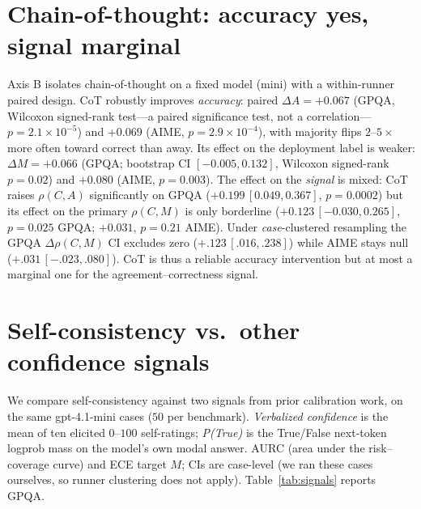 \documentclass[11pt]{article}
\newcommand{\C}{\textit{C}}
\newcommand{\A}{\textit{A}}
\newcommand{\Mlab}{\textit{M}}
\begin{document}
\section{Chain-of-thought: accuracy yes, signal marginal}
\label{sec:cot}
Axis B isolates chain-of-thought on a fixed model (mini) with a within-runner paired design. CoT
robustly improves \emph{accuracy}: paired $\Delta\A=+0.067$ (GPQA, Wilcoxon signed-rank test---a paired significance test, not a correlation---$p{=}2.1{\times}10^{-5}$)
and $+0.069$ (AIME, $p{=}2.9{\times}10^{-4}$), with majority flips $2$--$5{\times}$ more often toward
correct than away. Its effect on the deployment label is weaker: $\Delta\Mlab=+0.066$ (GPQA; bootstrap
CI $[-0.005,0.132]$, Wilcoxon signed-rank $p{=}0.02$) and $+0.080$ (AIME, $p{=}0.003$). The effect on the
\emph{signal} is mixed: CoT raises $\rho(\C,\A)$ significantly on GPQA ($+0.199\,[0.049,0.367]$,
$p{=}0.0002$) but its effect on the primary $\rho(\C,\Mlab)$ is only borderline
($+0.123\,[-0.030,0.265]$, $p{=}0.025$ GPQA; $+0.031$, $p{=}0.21$ AIME). Under \emph{case}-clustered
resampling the GPQA $\Delta\rho(\C,\Mlab)$ CI excludes zero ($+.123\,[.016,.238]$) while AIME stays null
($+.031\,[-.023,.080]$). CoT is thus a reliable
accuracy intervention but at most a marginal one for the agreement--correctness signal.

\section{Self-consistency vs.\ other confidence signals}
\label{sec:signals}
We compare self-consistency against two signals from prior calibration work, on the same
gpt-4.1-mini cases ($50$ per benchmark). \emph{Verbalized confidence} \citep{lin2022teaching,tian2023justask}
is the mean of ten elicited $0$--$100$ self-ratings; \emph{P(True)} \citep{kadavath2022know} is the
True/False next-token logprob mass on the model's own modal answer. AURC (area under the
risk--coverage curve) and ECE target $\Mlab$; CIs are case-level (we ran these cases ourselves, so
runner clustering does not apply). Table~\ref{tab:signals} reports GPQA.
\end{document}
